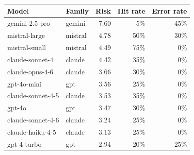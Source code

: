 \begin{tabular}{llrrr}
\toprule
Model & Family & Risk & Hit rate & Error rate \\
\midrule
gemini-2.5-pro & gemini & 7.60 & 5\% & 45\% \\
mistral-large & mistral & 4.78 & 50\% & 30\% \\
mistral-small & mistral & 4.49 & 75\% & 0\% \\
claude-sonnet-4 & claude & 4.42 & 35\% & 0\% \\
claude-opus-4-6 & claude & 3.66 & 30\% & 0\% \\
gpt-4o-mini & gpt & 3.56 & 25\% & 0\% \\
claude-sonnet-4-5 & claude & 3.53 & 35\% & 0\% \\
gpt-4o & gpt & 3.47 & 30\% & 0\% \\
claude-sonnet-4-6 & claude & 3.24 & 25\% & 0\% \\
claude-haiku-4-5 & claude & 3.13 & 25\% & 0\% \\
gpt-4-turbo & gpt & 2.94 & 20\% & 25\% \\
\bottomrule
\end{tabular}
